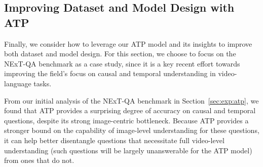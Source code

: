 \begin{table}[t]

\centering
\setlength\tabcolsep{0.1pt}
\caption{\textbf{Video-language (text-to-video) retrieval.} We show that our ATP analysis technique generalizes beyond video question answering settings. ($^*$ indicates zero-shot reported by prior work; see supplement for a more complete prior work comparisons table.)}
\label{tbl:vid-lang:all}
\end{table}

\subsection{Improving Dataset and Model Design with ATP}
\label{sec:exp:next-qa}

Finally, we consider how to leverage our ATP model and its insights to improve both dataset and model design. For this section, we choose to focus on the NExT-QA benchmark \cite{xiao2021next} as a case study, since it is a key recent effort towards improving the field's focus on causal and temporal understanding in video-language tasks.

 From our initial analysis of the NExT-QA benchmark in Section~\ref{sec:exp:atp}, we found that ATP provides a surprising degree of accuracy on causal and temporal questions, despite its strong image-centric bottleneck. Because ATP provides a stronger bound on the capability of image-level understanding for these questions, it can help better disentangle questions that necessitate full video-level understanding (such questions will be largely unanswerable for the ATP model) from ones that do not. 

